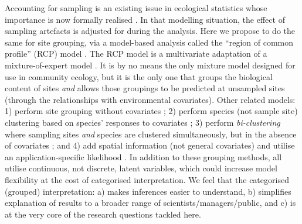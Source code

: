 \documentclass{statsoc}
\begin{document}
Accounting for sampling is an existing issue in ecological statistics whose importance is now formally realised \citep[for example see][which all deal with the specific task of species distribution model]{war13,fit15,fer15}. In that modelling situation, the effect of sampling artefacts is adjusted for during the analysis. Here we propose to do the same for site grouping, via a model-based analysis called the ``region of common profile'' (RCP) model \citep{fos13,lyo15}. The RCP model is a multivariate adaptation of a mixture-of-expert model \citep{Jac91,mcl00}. It is by no means the only mixture model designed for use in community ecology, but it is the only one that groups the biological content of sites \textit{and} allows those groupings to be predicted at unsampled sites (through the relationships with environmental covariates). Other related models: 1) perform site grouping without covariates \citep[and allow for heterogeneity, possibly due to covariates, through a latent Dirichlet level,][]{val14}; 2) perform species (not sample site) clustering based on species' responses to covariates \citep{ova11,dun11,dun13, hui13,fos15}; 3) perform \textit{bi-clustering} where sampling sites \textit{and} species are clustered simultaneously, but in the absence of covariates \citep{ple14,fer16}; and 4) add spatial information (not general covariates) and utilise an application-specific likelihood \citep{pri00,gui05,cor08}. In addition to these grouping methods, \citet{hui15c,war15a,ova15,ova16} all utilise continuous, not discrete, latent variables, which could increase model flexibility at the cost of categorised interpretation. We feel that the categorised (grouped) interpretation: a) makes inferences easier to understand, b) simplifies explanation of results to a broader range of scientists/managers/public, and c) is at the very core of the research questions tackled here.

\end{document}
